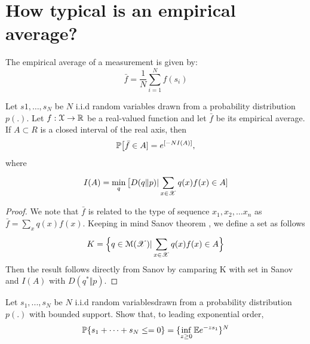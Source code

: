\documentclass[letterpaper,english,10pt]{article}
\begin{document}
 \section{How typical is an empirical average?}
 The empirical average of a measurement is given by:
 \begin{equation}
     \bar{f} = \frac{1}{N}\sum_{i=1}^{N}f(s_i)
 \end{equation}
 \begin{cor}
 Let $s1,\dots ,s_N$ be $N$ i.i.d random variables drawn from a probability distribution $p(.)$. Let $f:\mathcal{X}\rightarrow \R$ be a real-valued  function and let $\bar{f}$ be its empirical average. If $A\subset R$ is a closed interval of the real axis, then 
 \begin{equation}
     \P\big[\bar{f}\in A]= e^{[-NI(A)]},
 \end{equation}
 where
 \begin{equation}
     I(A)=\min_q\big[D(q\Vert p)| \sum_{x\in \sX}^{} q(x)f(x) \in A]
 \end{equation}
 \end{cor}
 \begin{proof}
 We note that $\bar{f}$ is related to the type of sequence $x_1,x_2,\dots x_n$ as $\bar{f}=\sum_{x}^{}q(x)f(x)$. Keeping in mind Sanov theorem , we define a set as follows 
 \begin{equation}
     K= \Big\{ q\in \mathcal{M}(\sX)|\sum_{x\in \sX}^{} q(x)f(x) \in A \Big\}
 \end{equation}
 Then the result follows directly from Sanov by camparing K with set in Sanov and $I(A)$ with $D(q^* \Vert p)$.
 \end{proof}
 
 \begin{exmp}
 	Let $s_1,...,s_N$ be $N$ i.i.d random variablesdrawn from a probability distribution $p(.)$ with bounded support. Show that, to leading exponential order, 
   \begin{equation}
       \P \{s_1 + \dots + s_N \leq  = 0\} = \{ \inf_{z\geq 0} \E {e^{-zs_1}}  \}^N
   \end{equation}
     
 \end{exmp}
 
\end{document}
